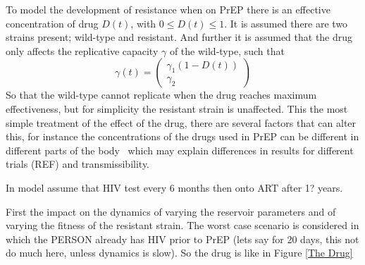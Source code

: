\documentclass[DIV=15]{scrartcl}
\begin{document}
\fi








To  model the development of resistance when on PrEP there is an effective concentration of drug $D(t)$, with $0 \leq D(t) \leq 1$. It is assumed there are two strains present; wild-type and resistant. And further it is assumed that the drug only affects the replicative  capacity $\gamma$ of the wild-type, such that \begin{equation*}
 \gamma(t) = \begin{pmatrix} \gamma_1(1- D(t)) \\ \gamma_2 \end{pmatrix}
\end{equation*}
So that the wild-type cannot  replicate when the drug reaches maximum effectiveness, but for simplicity the resistant strain is unaffected.
This the most simple treatment of the effect of the drug, there are several factors that can alter  this, for instance the concentrations of the drugs used in PrEP can be different in different parts of the body~\cite{patterson2011}
 which may explain differences in results for different trials (REF) and transmissibility.





\iffalse










In model assume that HIV test every 6 months then onto ART after 1?  years.



First the impact on the dynamics of varying the reservoir parameters and of varying the  fitness of the resistant strain. The worst case scenario is considered in which the PERSON already has HIV prior to PrEP (lets say for 20 days, this not do much here, unless dynamics is slow). So the drug is like in Figure \ref{The Drug}
\end{document}
